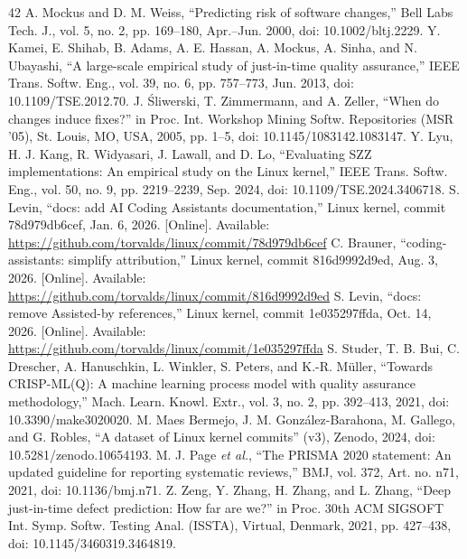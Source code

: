 \begin{thebibliography}{42}
 A. Mockus and D. M. Weiss, ``Predicting risk of software changes,'' Bell Labs Tech. J., vol. 5, no. 2, pp. 169--180, Apr.--Jun. 2000, doi: \mbox{10.1002/bltj.2229}.
 Y. Kamei, E. Shihab, B. Adams, A. E. Hassan, A. Mockus, A. Sinha, and N. Ubayashi, ``A large-scale empirical study of just-in-time quality assurance,'' IEEE Trans. Softw. Eng., vol. 39, no. 6, pp. 757--773, Jun. 2013, doi: \mbox{10.1109/TSE.2012.70}.
 J. Śliwerski, T. Zimmermann, and A. Zeller, ``When do changes induce fixes?'' in Proc. Int. Workshop Mining Softw. Repositories (MSR '05), St. Louis, MO, USA, 2005, pp. 1--5, doi: \mbox{10.1145/1083142.1083147}.
 Y. Lyu, H. J. Kang, R. Widyasari, J. Lawall, and D. Lo, ``Evaluating SZZ implementations: An empirical study on the Linux kernel,'' IEEE Trans. Softw. Eng., vol. 50, no. 9, pp. 2219--2239, Sep. 2024, doi: \mbox{10.1109/TSE.2024.3406718}.
 S. Levin, ``docs: add AI Coding Assistants documentation,'' Linux kernel, commit 78d979db6cef, Jan. 6, 2026. [Online]. Available: \url{https://github.com/torvalds/linux/commit/78d979db6cef}
 C. Brauner, ``coding-assistants: simplify attribution,'' Linux kernel, commit 816d9992d9ed, Aug. 3, 2026. [Online]. Available: \url{https://github.com/torvalds/linux/commit/816d9992d9ed}
 S. Levin, ``docs: remove Assisted-by references,'' Linux kernel, commit 1e035297ffda, Oct. 14, 2026. [Online]. Available: \url{https://github.com/torvalds/linux/commit/1e035297ffda}
 S. Studer, T. B. Bui, C. Drescher, A. Hanuschkin, L. Winkler, S. Peters, and K.-R. M\"uller, ``Towards CRISP-ML(Q): A machine learning process model with quality assurance methodology,'' Mach. Learn. Knowl. Extr., vol. 3, no. 2, pp. 392--413, 2021, doi: 10.3390/make3020020.
 M. Maes Bermejo, J. M. González-Barahona, M. Gallego, and G. Robles, ``A dataset of Linux kernel commits'' (v3), Zenodo, 2024, doi: 10.5281/zenodo.10654193.
 M. J. Page \emph{et al.}, ``The PRISMA 2020 statement: An updated guideline for reporting systematic reviews,'' BMJ, vol. 372, Art. no. n71, 2021, doi: 10.1136/bmj.n71.
 Z. Zeng, Y. Zhang, H. Zhang, and L. Zhang, ``Deep just-in-time defect prediction: How far are we?'' in Proc. 30th ACM SIGSOFT Int. Symp. Softw. Testing Anal. (ISSTA), Virtual, Denmark, 2021, pp. 427--438, doi: \mbox{10.1145/3460319.3464819}.

\end{thebibliography}
